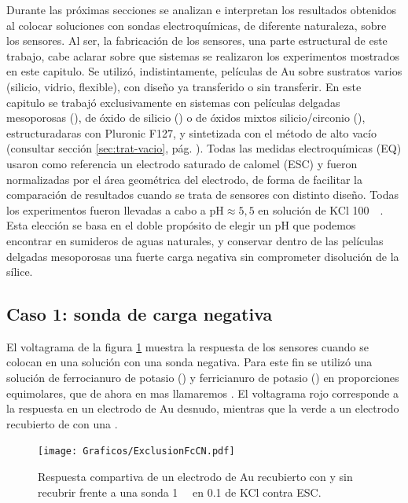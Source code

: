 	 Durante las próximas secciones se analizan e interpretan los resultados obtenidos al colocar soluciones con sondas electroquímicas, de diferente naturaleza, sobre los sensores. Al ser, la fabricación de los sensores, una parte estructural de este trabajo, cabe aclarar sobre que sistemas se realizaron los experimentos mostrados en este capitulo. Se utilizó, indistintamente, películas de Au sobre sustratos varios (silicio, vidrio, flexible), con diseño ya transferido o sin transferir. En este capitulo se trabajó exclusivamente en sistemas con películas delgadas mesoporosas (\pdm), de óxido de silicio (\pdmF) o de óxidos mixtos silicio/circonio (\pdmZ), estructuradaras con Pluronic F127, y sintetizada con el método de alto vacío (consultar sección \ref{sec:trat-vacio}, pág. \pageref{sec:trat-vacio}). Todas las medidas electroquímicas (EQ) usaron como referencia un electrodo saturado de calomel (ESC) y fueron normalizadas por el área geométrica del electrodo, de forma de facilitar la comparación de resultados cuando se trata de sensores con distinto diseño. Todas los experimentos fueron llevadas a cabo a $\text{pH}\approx5,5$ en solución de KCl \SI{100}{\milli\Molar}. Esta elección se basa en el doble propósito de elegir un pH que podemos encontrar en sumideros de aguas naturales, y conservar dentro de las películas delgadas mesoporosas una fuerte carga negativa sin comprometer disolución de la sílice.

	\subsection{Caso 1: sonda de carga negativa}

	 El voltagrama de la figura \ref{fig:exclusion_vs_Au} muestra la respuesta de los sensores cuando se colocan en una solución con una sonda negativa. Para este fin se utilizó una solución de ferrocianuro de potasio (\ferroCompleto) y ferricianuro de potasio (\ferriCompleto) en proporciones equimolares, que de ahora en mas llamaremos \fe. El voltagrama rojo corresponde a la respuesta en un electrodo de Au desnudo, mientras que la verde a un electrodo recubierto de con una \pdm.
	
			\begin{figure}[ht]
				\centering
		 	    \texttt{[image: Graficos/ExclusionFcCN.pdf]}
		        \caption[Exclusión electrostática en \pdmF]{Respuesta compartiva de un electrodo de Au recubierto con \pdmF\space y sin recubrir frente a una sonda \fe\space \SI{1}{\milli\Molar} en \SI{0.1}{\Molar} de KCl contra ESC.}
		        \label{fig:exclusion_vs_Au}
		      	\end{figure}
	
